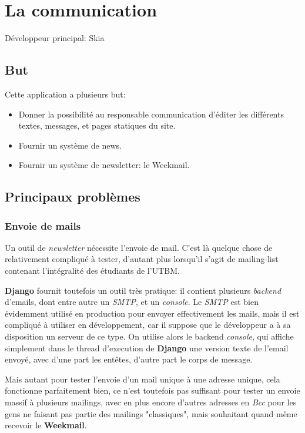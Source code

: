 \documentclass[a4paper]{report}
\begin{document}
\chapter{La communication}
\label{sec:la_communication}
\par Développeur principal: Skia

\section{But}
\label{sub:but}
\par Cette application a plusieurs but:
\begin{itemize}
    \item Donner la possibilité au responsable communication d'éditer les différents textes, messages, et pages
        statiques du site.
    \item Fournir un système de news.
    \item Fournir un système de newsletter: le Weekmail.
\end{itemize}

\section{Principaux problèmes}
\label{sec:principaux_problemes}

\subsection{Envoie de mails}
\label{sub:envoie_de_mails}
\par Un outil de \emph{newsletter} nécessite l'envoie de mail. C'est là quelque chose de relativement compliqué à
tester, d'autant plus lorsqu'il s'agit de mailing-list contenant l'intégralité des étudiants de l'UTBM.

\par \textbf{Django} fournit toutefois un outil très pratique: il contient plusieurs \emph{backend} d'emails, dont entre
autre un \emph{SMTP}, et un \emph{console}. Le \emph{SMTP} est bien évidemment utilisé en production pour envoyer
effectivement les mails, mais il est compliqué à utiliser en développement, car il suppose que le développeur a à sa
disposition un serveur de ce type. On utilise alors le backend \emph{console}, qui affiche simplement dans le thread
d'execution de \textbf{Django} une version texte de l'email envoyé, avec d'une part les entêtes, d'autre part le corps
de message.

\par Mais autant pour tester l'envoie d'un mail unique à une adresse unique, cela fonctionne parfaitement bien, ce n'est
toutefois pas suffisant pour tester un envoie massif à plusieurs mailings, avec en plus encore d'autres adresses en
\emph{Bcc} pour les gens ne faisant pas partie des mailings "classiques", mais souhaitant quand même recevoir le
\textbf{Weekmail}.
\end{document}

